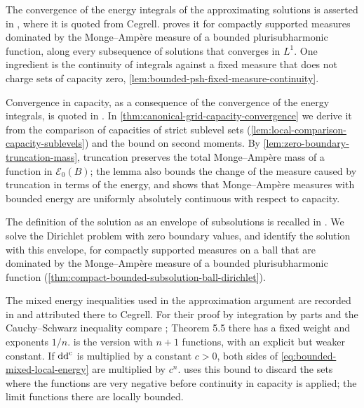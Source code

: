 The convergence of the energy integrals of the approximating solutions is asserted in \cite[Theorem 2.2(3)]{Din07MixedV1}, where it is quoted from Cegrell.  proves it for compactly supported measures dominated by the Monge--Amp\`ere measure of a bounded plurisubharmonic function, along every subsequence of solutions that converges in $L^1$. One ingredient is the continuity of integrals against a fixed measure that does not charge sets of capacity zero, \cref{lem:bounded-psh-fixed-measure-continuity}.

Convergence in capacity, as a consequence of the convergence of the energy integrals, is quoted in \cite[Theorem 2.3]{Din07MixedV1}. In \cref{thm:canonical-grid-capacity-convergence} we derive it from the comparison of capacities of strict sublevel sets (\cref{lem:local-comparison-capacity-sublevels}) and the bound on second moments. By \cref{lem:zero-boundary-truncation-mass}, truncation preserves the total Monge--Amp\`ere mass of a function in $\mathcal E_0(B)$; the lemma also bounds the change of the measure caused by truncation in terms of the energy, and shows that Monge--Amp\`ere measures with bounded energy are uniformly absolutely continuous with respect to capacity.

The definition of the solution as an envelope of subsolutions is recalled in \cite[Definition 2.4 and the following paragraph]{Din07MixedV1}. We solve the Dirichlet problem with zero boundary values, and identify the solution with this envelope, for compactly supported measures on a ball that are dominated by the Monge--Amp\`ere measure of a bounded plurisubharmonic function (\cref{thm:compact-bounded-subsolution-ball-dirichlet}).

The mixed energy inequalities used in the approximation argument are recorded in \cite[Section 2]{Din07MixedV1} and attributed there to Cegrell. For their proof by integration by parts and the Cauchy--Schwarz inequality compare \cite[Lemma 5.4 and Theorem 5.5]{Ceg04}; Theorem 5.5 there has a fixed weight and exponents $1/n$.  is the version with $n+1$ functions, with an explicit but weaker constant. If $\mathrm{dd}^{\mathrm{c}}$ is multiplied by a constant $c>0$, both sides of \eqref{eq:bounded-mixed-local-energy} are multiplied by $c^n$.  uses this bound to discard the sets where the functions are very negative before continuity in capacity is applied; the limit functions there are locally bounded.

